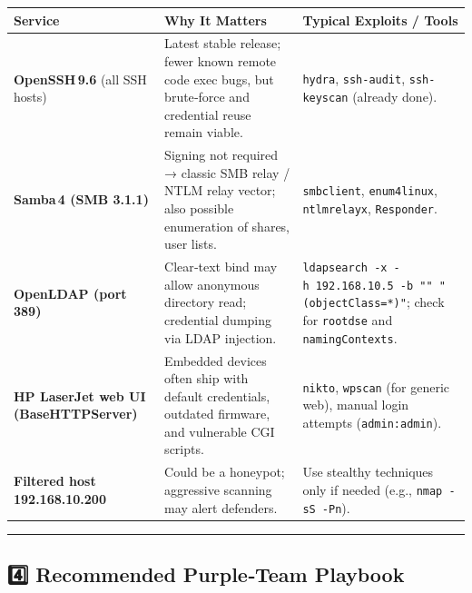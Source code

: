 \begin{longtable}[]{@{}
  >{\raggedright\arraybackslash}p{}
  >{\raggedright\arraybackslash}p{}
  >{\raggedright\arraybackslash}p{}@{}}
\toprule\noalign{}
\begin{minipage}[b]{\linewidth}\raggedright
Service
\end{minipage} & \begin{minipage}[b]{\linewidth}\raggedright
Why It Matters
\end{minipage} & \begin{minipage}[b]{\linewidth}\raggedright
Typical Exploits / Tools
\end{minipage} \\
\midrule\noalign{}
\endhead
\bottomrule\noalign{}
\endlastfoot
\textbf{OpenSSH\,9.6} (all SSH hosts) & Latest stable release; fewer
known remote code exec bugs, but brute‑force and credential reuse remain
viable. & \texttt{hydra}, \texttt{ssh-audit}, \texttt{ssh-keyscan}
(already done). \\
\textbf{Samba\,4 (SMB 3.1.1)} & Signing not required → classic SMB relay
/ NTLM relay vector; also possible enumeration of shares, user lists. &
\texttt{smbclient}, \texttt{enum4linux}, \texttt{ntlmrelayx},
\texttt{Responder}. \\
\textbf{OpenLDAP (port\,389)} & Clear‑text bind may allow anonymous
directory read; credential dumping via LDAP injection. &
\texttt{ldapsearch\ -x\ -h\ 192.168.10.5\ -b\ ""\ "(objectClass=*)"};
check for \texttt{rootdse} and \texttt{namingContexts}. \\
\textbf{HP LaserJet web UI (BaseHTTPServer)} & Embedded devices often
ship with default credentials, outdated firmware, and vulnerable CGI
scripts. & \texttt{nikto}, \texttt{wpscan} (for generic web), manual
login attempts (\texttt{admin:admin}). \\
\textbf{Filtered host 192.168.10.200} & Could be a honeypot; aggressive
scanning may alert defenders. & Use stealthy techniques only if needed
(e.g., \texttt{nmap\ -sS\ -Pn}). \\
\end{longtable}

\begin{center}\rule{0.5\linewidth}{0.5pt}\end{center}

\subsection{4️⃣ Recommended Purple‑Team
Playbook}\label{recommended-purpleteam-playbook}

